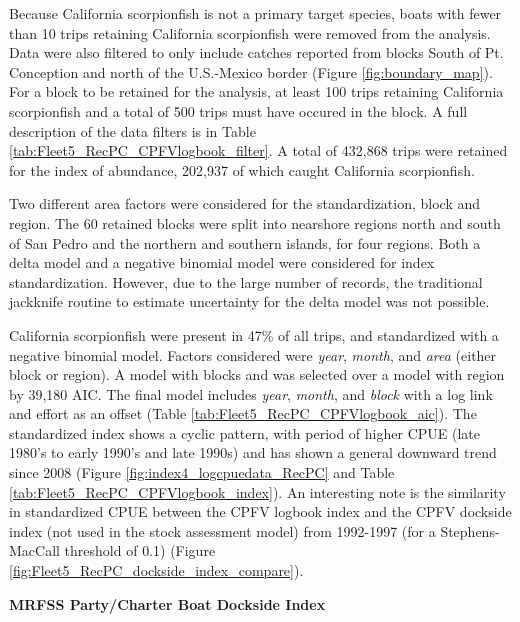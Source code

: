 \documentclass[12pt,]{article}
\begin{document}
Because California scorpionfish is not a primary target species, boats
with fewer than 10 trips retaining California scorpionfish were removed
from the analysis. Data were also filtered to only include catches
reported from blocks South of Pt. Conception and north of the
U.S.-Mexico border (Figure \ref{fig:boundary_map}). For a block to be
retained for the analysis, at least 100 trips retaining California
scorpionfish and a total of 500 trips must have occured in the block. A
full description of the data filters is in Table
\ref{tab:Fleet5_RecPC_CPFVlogbook_filter}. A total of 432,868 trips were
retained for the index of abundance, 202,937 of which caught California
scorpionfish.

Two different area factors were considered for the standardization,
block and region. The 60 retained blocks were split into nearshore
regions north and south of San Pedro and the northern and southern
islands, for four regions. Both a delta model and a negative binomial
model were considered for index standardization. However, due to the
large number of records, the traditional jackknife routine to estimate
uncertainty for the delta model was not possible.

California scorpionfish were present in 47\% of all trips, and
standardized with a negative binomial model. Factors considered were
\emph{year}, \emph{month}, and \emph{area} (either block or region). A
model with blocks and was selected over a model with region by 39,180
AIC. The final model includes \emph{year}, \emph{month}, and
\emph{block} with a log link and effort as an offset (Table
\ref{tab:Fleet5_RecPC_CPFVlogbook_aic}). The standardized index shows a
cyclic pattern, with period of higher CPUE (late 1980's to early 1990's
and late 1990s) and has shown a general downward trend since 2008
(Figure \ref{fig:index4_logcpuedata_RecPC} and Table
\ref{tab:Fleet5_RecPC_CPFVlogbook_index}). An interesting note is the
similarity in standardized CPUE between the CPFV logbook index and the
CPFV dockside index (not used in the stock assessment model) from
1992-1997 (for a Stephens-MacCall threshold of 0.1) (Figure
\ref{fig:Fleet5_RecPC_dockside_index_compare}).

\textbf{MRFSS Party/Charter Boat Dockside Index}
\end{document}
